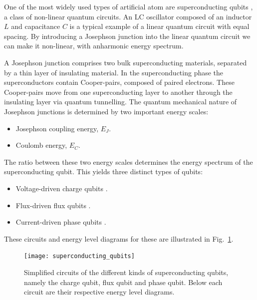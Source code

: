 One of the most widely used types of artificial atom are superconducting qubits \cite{bib:martinis1985energy, bib:shnirman1997quantum, bib:averin1998adiabatic, bib:devoret2004superconducting, bib:makhlin2001quantum}, a class of non-linear quantum circuits. An LC oscillator composed of an inductor $L$ and capacitance $C$ is a typical example of a linear quantum circuit with equal spacing. By introducing a Josephson junction into the linear quantum circuit we can make it non-linear, with anharmonic energy spectrum.

A Josephson junction \cite{bib:josephson1974the} comprises two bulk superconducting materials, separated by a thin layer of insulating material. In the superconducting phase the superconductors contain Cooper-pairs, composed of paired electrons. These Cooper-pairs move from one superconducting layer to another through the insulating layer via quantum tunnelling. The quantum mechanical nature of Josephson junctions is determined by two important energy scales:
\begin{itemize}
\item Josephson coupling energy, $E_{J}$.
\item Coulomb energy, $E_C$.
\end{itemize}
The ratio between these two energy scales determines the energy spectrum of the superconducting qubit. This yields three distinct types of qubits:
\begin{itemize}
\item Voltage-driven charge qubits \cite{bib:bouchiat1998quantum, bib:nakamura1999coherent}.
	\item Flux-driven flux qubits \cite{bib:friedman2000quantum, bib:van2000quantum}.
	\item Current-driven phase qubits \cite{bib:martinis2002rabi}.
\end{itemize} 
These circuits and energy level diagrams for these are illustrated in Fig.~\ref{fig:superconductor_circuits}.

\begin{figure}[!htbp]
\texttt{[image: superconducting\_qubits]}
\caption{Simplified circuits of the different kinds of superconducting qubits, namely the charge qubit, flux qubit and phase qubit. Below each circuit are their respective energy level diagrams.}\label{fig:superconductor_circuits}
\end{figure}

